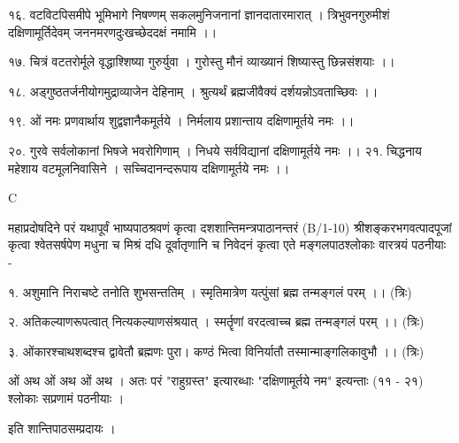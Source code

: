 १६. वटविटपिसमीपे भूमिभागे निषण्णम् 
सकलमुनिजनानां ज्ञानदातारमारात् ।
त्रिभुवनगुरुमीशं दक्षिणामूर्तिदेवम् 
जननमरणदुःखच्छेददक्षं नमामि ।। 

१७. चित्रं वटतरोर्मूले वृद्धाश्शिष्या गुरुर्युवा । 
गुरोस्तु मौनं व्याख्यानं शिष्यास्तु छिन्नसंशयाः ।।

१८. अड्गुष्ठतर्जनीयोगमुद्राव्याजेन देहिनाम् ।
श्रुत्यर्थं ब्रह्मजीवैक्यं दर्शयन्नोऽवताच्छिवः ।। 

१९. ओं नमः प्रणवार्थाय शुद्वज्ञानैकमूर्तये ।
निर्मलाय प्रशान्ताय दक्षिणामूर्तये नमः ।।

२०. गुरवे सर्वलोकानां भिषजे भवरोगिणाम् । 
निधये सर्वविद्यानां दक्षिणामूर्तये नमः ।। 
२१. चिद्धनाय महेशाय वटमूलनिवासिने । 
सच्चिदानन्दरूपाय दक्षिणामूर्तये नमः ।। 

C

महाप्रदोषदिने परं यथापूर्वं भाष्यपाठश्रवणं कृत्वा दशशान्तिमन्त्रपाठानन्तरं (B/1-10) श्रीशङ्करभगवत्पादपूजां कृत्वा श्वेतसर्षपेण मधुना च मिश्रं दधि दूर्वातृणानि च निवेदनं कृत्वा एते मङ्गलपाठश्लोकाः वारत्रयं पठनीयाः - 

१. अशुमानि निराचष्टे तनोति शुभसन्ततिम् ।
स्मृतिमात्रेण यत्पुंसां ब्रह्म तन्मङ्गलं परम् ।। (त्रिः)

२. अतिकल्याणरूपत्वात् नित्यकल्याणसंश्रयात् ।
स्मर्तॄणां वरदत्वाच्च ब्रह्म तन्मङ्गलं परम् ।। (त्रिः)

३. ओंकारश्चाथशब्दश्च द्वावेतौ ब्रह्मणः पुरा।
कण्ठं भित्वा विनिर्यातौ तस्मान्माङ्गलिकावुभौ ।। (त्रिः)

ओं अथ ओं अथ ओं अथ ।
अतः परं "राहुग्रस्त" इत्यारब्धाः "दक्षिणामूर्तये नम"
इत्यन्ताः (११ - २१) श्लोकाः सप्रणामं पठनीयाः । 

इति शान्तिपाठसम्प्रदायः । 
